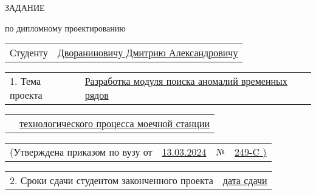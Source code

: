 \documentclass[12pt, А4, twoside]{article} %
\begin{document}
	\begin{center} 
		\fontsize{24}{30} \textsf{ЗАДАНИЕ}
		\par 
		\fontsize{14}{17.5} \textrm{по дипломному проектированию}
	\end{center}  
	
	\begin{flushleft} 
		\fontsize{12}{15} %
		
		\begin{tabular}{p{1.9cm} p{14.95cm}}
			\textsf{Студенту} & 
			\uline{\textsf{Двораниновичу Дмитрию Александровичу} \hspace{7.9cm}} \vspace{1pt}  
		\end{tabular} 
		
		\begin{tabular}{p{2.8cm} p{14.05cm}}
			\textsf{1. Тема проекта} & 
			\uline{\textsf{Разработка модуля поиска аномалий временных рядов\phantom{абра кадабра этот латех дона} }}  \vspace{1pt}   
		\end{tabular} 
		
		\begin{tabular}{p{2.8cm} p{14.05cm}} 
			& \uline{\textsf{технологического процесса моечной станции} \hspace{6.6cm}} \vspace{1pt} 
		\end{tabular} 
		
		\begin{tabular}{p{5.9cm} p{4.8cm} p{0.3cm} p{5.0cm}} 
			\textsf{(Утверждена приказом по вузу от} &
			\centering \uline{\hspace{1.4cm}\textsf{13.03.2024}\hspace{1.4cm}}  \vspace{2pt}  &
			\centering \textsf{№} &
			\centering  \uline{\hspace{1.6cm}\textsf{249-C \hspace{0.5cm} )}\hspace{1.5cm}}  
		\end{tabular} 
		
		\begin{tabular}{p{9.4cm}  p{7.45cm}} 
			\textsf{2. Сроки сдачи студентом законченного проекта} & \centering \uline{\hspace{3.0cm}\textsf{дата сдачи}\hspace{2.5cm}} \vspace{1pt} 
		\end{tabular} 
		

\end{flushleft}
\end{document}
